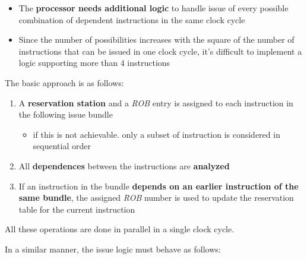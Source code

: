\documentclass[english]{article}
\begin{document}
\begin{itemize}
  \item The \textbf{processor needs additional logic} to handle issue of every possible combination of dependent instructions in the same clock cycle
  \item Since the number of possibilities increases with the square of the number of instructions that can be issued in one clock cycle, it's difficult to implement a logic supporting more than \(4\) instructions
\end{itemize}

\bigskip
The basic approach is as follows:

\begin{enumerate}
  \item A \textbf{reservation station} and a \textit{ROB} entry is assigned to each instruction in the following issue bundle
        \begin{itemize}
          \item if this is not achievable. only a subset of instruction is considered in sequential order
        \end{itemize}
  \item All \textbf{dependences} between the instructions are \textbf{analyzed}
  \item If an instruction in the bundle \textbf{depends on an earlier instruction of the same bundle}, the assigned \textit{ROB} number is used to update the reservation table for the current instruction
\end{enumerate}

All these operations are done in parallel in a single clock cycle.

In a similar manner, the issue logic must behave as follows:
\end{document}
